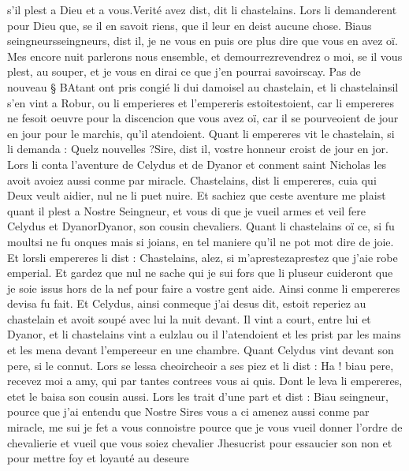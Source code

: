 \documentclass{article}
\begin{document}
\begin{pages}
      s’il plest a Dieu et a vous.Verité avez dist, dit li chastelains.
   Lors li demanderent pour Dieu que,
   se il en savoit riens, que il leur en deist aucune chose.
   Biaus seingneursseingneurs, dist il, 
      je ne vous en puis ore plus dire que vous en avez oï. Mes encore nuit parlerons nous ensemble, et 
      demourrezrevendrez o moi, se il vous plest, au souper, 
      et je vous en dirai ce que j’en 
      pourrai savoirscay. \pend
\pstart Pas de nouveau § BAtant ont pris congié li dui damoisel au 
   chastelain, et 
   li chastelainsil 
   s’en vint a 
   Robur, ou li emperieres et 
   l’empereris estoitestoient, 
   car li empereres ne fesoit oeuvre pour la discencion que vous avez oï, 
   car il se pourveoient de jour en jour pour le marchis, qu’il atendoient. 
   Quant li empereres vit le chastelain, si li demanda :
   Quelz nouvelles ?Sire, dist il, vostre honneur croist de jour en jor.
   Lors li conta l’aventure de Celydus et de Dyanor 
   et conment saint Nicholas les avoit avoiez aussi conme par miracle.
   Chastelains, dist li empereres, 
      cuia qui Deux veult aidier, nul ne li puet nuire. 
   Et sachiez que ceste aventure me plaist quant il plest a Nostre Seingneur, et vous di que je vueil armes 
   et veil fere Celydus et 
      DyanorDyanor, son cousin chevaliers.
   Quant li chastelains oï ce, 
   si fu moultsi ne fu onques mais si joians, 
   en tel maniere qu’il ne pot mot dire 
      de joie. 
   Et lorsli empereres 
   li dist :
   Chastelains, alez, si m’aprestezaprestez que j'aie 
      robe emperial. Et gardez que nul ne sache qui je sui fors que li pluseur cuideront que je soie issus 
      hors de la nef pour faire a vostre gent aide. \pend
\pstart Ainsi conme li empereres devisa fu fait. 
   Et Celydus, ainsi 
      conmeque j’ai desus dit, estoit reperiez au 
   chastelain et avoit soupé avec lui la nuit devant. Il vint a court, 
   entre lui et Dyanor, et li chastelains vint 
   a eulzlau ou il l'atendoient 
   et les prist par les mains et les mena devant l’empereeur en une chambre. 
   Quant Celydus vint devant son pere, si le connut. 
   Lors se lessa cheoircheoir a ses piez et li dist :
   Ha ! biau pere, recevez moi a amy, qui par tantes contrees vous ai quis.
   Dont le leva li empereres, 
   etet le baisa son cousin aussi. 
   Lors les trait d’une part et dist :
   Biau seingneur, pource que j’ai entendu que Nostre Sires vous a ci amenez aussi conme par miracle, 
   me sui je fet a vous connoistre pource que je vous vueil donner l’ordre de chevalierie et vueil que vous soiez chevalier Jhesucrist 
   pour essaucier son non et pour mettre foy et loyauté au deseure 

\end{pages}
\end{document}
